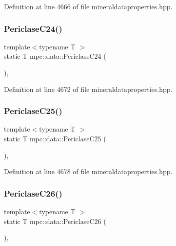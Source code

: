 Definition at line 4666 of file mineraldataproperties.\+hpp.

\mbox{\label{namespacempc_1_1data_a699ae309e513e74e1425bc14f6f460f1}} 
\subsubsection{\texorpdfstring{Periclase\+C24()}{PericlaseC24()}}
{\footnotesize\ttfamily template$<$typename T $>$ \\
static T mpc\+::data\+::\+Periclase\+C24 (\begin{DoxyParamCaption}{ }\end{DoxyParamCaption})\hspace{0.3cm}{\ttfamily [inline]}, {\ttfamily [static]}}



Definition at line 4672 of file mineraldataproperties.\+hpp.

\mbox{\label{namespacempc_1_1data_a2f260d0caecfe10da3e77ab76a7e156a}} 
\subsubsection{\texorpdfstring{Periclase\+C25()}{PericlaseC25()}}
{\footnotesize\ttfamily template$<$typename T $>$ \\
static T mpc\+::data\+::\+Periclase\+C25 (\begin{DoxyParamCaption}{ }\end{DoxyParamCaption})\hspace{0.3cm}{\ttfamily [inline]}, {\ttfamily [static]}}



Definition at line 4678 of file mineraldataproperties.\+hpp.

\mbox{\label{namespacempc_1_1data_aef5437da43940ba661031b1c5be5d265}} 
\subsubsection{\texorpdfstring{Periclase\+C26()}{PericlaseC26()}}
{\footnotesize\ttfamily template$<$typename T $>$ \\
static T mpc\+::data\+::\+Periclase\+C26 (\begin{DoxyParamCaption}{ }\end{DoxyParamCaption})\hspace{0.3cm}{\ttfamily [inline]}, {\ttfamily [static]}}



